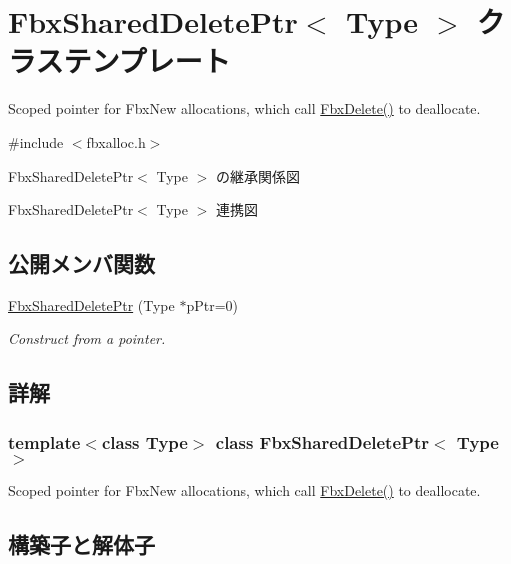 \hypertarget{class_fbx_shared_delete_ptr}{}\section{Fbx\+Shared\+Delete\+Ptr$<$ Type $>$ クラステンプレート}
\label{class_fbx_shared_delete_ptr}


Scoped pointer for Fbx\+New allocations, which call \hyperlink{fbxalloc_8h_a55138f34ac93c519a78f624178c128d6}{Fbx\+Delete()} to deallocate.  




{\ttfamily \#include $<$fbxalloc.\+h$>$}



Fbx\+Shared\+Delete\+Ptr$<$ Type $>$ の継承関係図


Fbx\+Shared\+Delete\+Ptr$<$ Type $>$ 連携図
\subsection*{公開メンバ関数}
\begin{DoxyCompactItemize}
\item 
\hyperlink{class_fbx_shared_delete_ptr_a35665b463cbb2e437b4bf3a228de8678}{Fbx\+Shared\+Delete\+Ptr} (Type $\ast$p\+Ptr=0)
\begin{DoxyCompactList}\small\item\em Construct from a pointer. \end{DoxyCompactList}\end{DoxyCompactItemize}


\subsection{詳解}
\subsubsection*{template$<$class Type$>$\newline
class Fbx\+Shared\+Delete\+Ptr$<$ Type $>$}

Scoped pointer for Fbx\+New allocations, which call \hyperlink{fbxalloc_8h_a55138f34ac93c519a78f624178c128d6}{Fbx\+Delete()} to deallocate. 

\subsection{構築子と解体子}
\mbox{\label{class_fbx_shared_delete_ptr_a35665b463cbb2e437b4bf3a228de8678}} 
